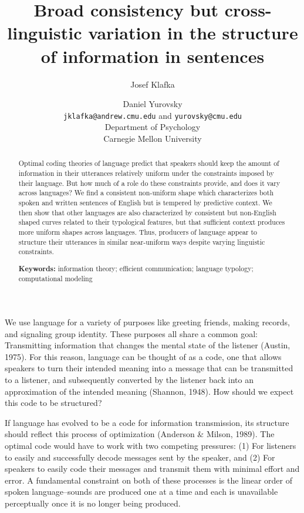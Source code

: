 \documentclass[10pt, letterpaper]{article}
\title{Broad consistency but cross-linguistic variation in the structure of
information in sentences}
\author{Josef Klafka \and Daniel Yurovsky \\
        \texttt{jklafka@andrew.cmu.edu} and \texttt{yurovsky@cmu.edu} \\
       Department of Psychology \\ Carnegie Mellon University}
\begin{document}
\maketitle

\begin{abstract}
Optimal coding theories of language predict that speakers should keep
the amount of information in their utterances relatively uniform under
the constraints imposed by their language. But how much of a role do
these constraints provide, and does it vary across languages? We find a
consistent non-uniform shape which characterizes both spoken and written
sentences of English but is tempered by predictive context. We then show
that other languages are also characterized by consistent but
non-English shaped curves related to their typological features, but
that sufficient context produces more uniform shapes across languages.
Thus, producers of language appear to structure their utterances in
similar near-uniform ways despite varying linguistic constraints.

\textbf{Keywords:}
information theory; efficient communication; language typology;
computational modeling
\end{abstract}

We use language for a variety of purposes like greeting friends, making
records, and signaling group identity. These purposes all share a common
goal: Transmitting information that changes the mental state of the
listener (Austin, 1975). For this reason, language can be thought of as
a code, one that allows speakers to turn their intended meaning into a
message that can be transmitted to a listener, and subsequently
converted by the listener back into an approximation of the intended
meaning (Shannon, 1948). How should we expect this code to be
structured?

If language has evolved to be a code for information transmission, its
structure should reflect this process of optimization (Anderson \&
Milson, 1989). The optimal code would have to work with two competing
pressures: (1) For listeners to easily and successfully decode messages
sent by the speaker, and (2) For speakers to easily code their messages
and transmit them with minimal effort and error. A fundamental
constraint on both of these processes is the linear order of spoken
language--sounds are produced one at a time and each is unavailable
perceptually once it is no longer being produced.
\end{document}
